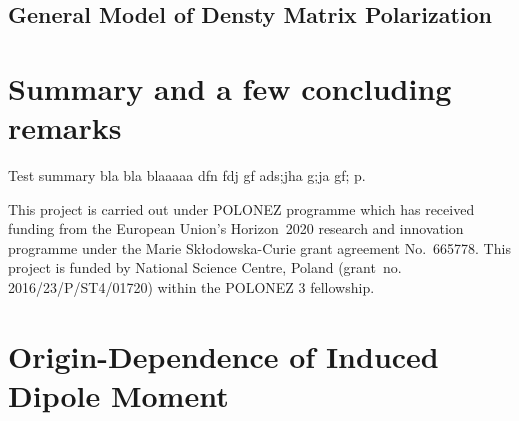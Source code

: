 \documentclass[aip,graphicx]{revtex4-1}
\begin{document}
\subsection{General Model of Densty Matrix Polarization}








\section{\label{s:5}Summary and a few concluding remarks}
Test summary bla bla blaaaaa dfn fdj gf ads;jha g;ja gf; p.

\begin{acknowledgments}
This project is carried out under POLONEZ programme which has received funding from the European Union's
Horizon~2020 research and innovation programme under the Marie Skłodowska-Curie grant agreement 
No.~665778. This project is funded by National Science Centre, Poland 
(grant~no. 2016/23/P/ST4/01720) within the POLONEZ 3 fellowship.
\end{acknowledgments}

%
\appendix

\section{\label{a:orig-dep} Origin-Dependence of Induced Dipole Moment}
\end{document}

